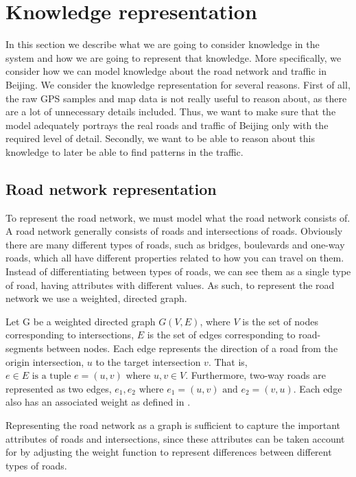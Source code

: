\section{Knowledge representation}
In this section we describe what we are going to consider knowledge in the system and how we are going to represent that knowledge. More specifically, we consider how we can model knowledge about the road network and traffic in Beijing. We consider the knowledge representation for several reasons. First of all, the raw GPS samples and map data is not really useful to reason about, as there are a lot of unnecessary details included. Thus, we want to make sure that the model adequately portrays the real roads and traffic of Beijing only with the required level of detail. Secondly, we want to be able to reason about this knowledge to later be able to find patterns in the traffic.

\subsection{Road network representation}\label{sec:road-network-rep}
To represent the road network, we must model what the road network consists of. A road network generally consists of roads and intersections of roads. Obviously there are many different types of roads, such as bridges, boulevards and one-way roads, which all have different properties related to how you can travel on them. Instead of differentiating between types of roads, we can see them as a single type of road, having attributes with different values. As such, to represent the road network we use a weighted, directed graph.

Let G be a weighted directed graph $G(V,E)$, where $V$ is the set of nodes corresponding to intersections, $E$ is the set of edges corresponding to road-segments between nodes. Each edge represents the direction of a road from the origin intersection, $u$ to the target intersection $v$. That is, $e \in E \text{ is a tuple } e=(u, v) \text{ where } u, v \in V$. Furthermore, two-way roads are represented as two edges, $e_1, e_2 \text{ where } e_1 = (u, v) \text{ and } e_2=(v, u)$. Each edge also has an associated weight as defined in .

Representing the road network as a graph is sufficient to capture the important attributes of roads and intersections, since these attributes can be taken account for by adjusting the weight function to represent differences between different types of roads.

